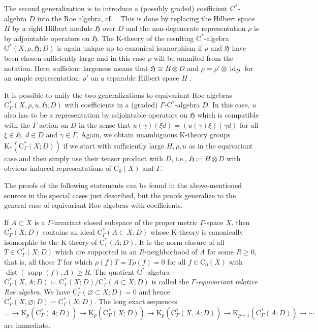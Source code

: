 \documentclass[11pt]{article}
\numberwithin{equation}{section}
\numberwithin{equation}{section}
\theoremstyle{definition}
\newcommand{\Ct}{\mathrm{C}}
\newcommand{\Cz}{\Ct_0}
\newcommand{\HilbertMod}{\mathfrak{H}}
\DeclareMathOperator{\id}{id}
\DeclareMathOperator{\dist}{dist}
\DeclareMathOperator{\supp}{supp}
\newcommand{\K}{\mathrm{K}}
\newcommand{\textCstar}{\ensuremath{\mathrm{C}^*\!}}
\newcommand{\Roe}{\mathrm{C}^*}
\begin{document}
The second generalization is to introduce a (possibly graded) coefficient \textCstar-algebra $D$ into the Roe algebra, cf.\ \cite{HankePapeSchick,HigsonPedersenRoe,WulffTwisted}. This is done by replacing the Hilbert space $H$ by a right Hilbert module $\HilbertMod$ over $D$ and the non-degenerate representation $\rho$ is by adjointable operators on $\HilbertMod$.
The $\K$-theory of the resulting \textCstar-algebra $\Roe(X,\rho,\HilbertMod;D)$ is again unique up to canonical isomorphism if $\rho$ and $\HilbertMod$ have been chosen sufficiently large and in this case $\rho$ will be ommited from the notation. Here, sufficient largeness means that $\HilbertMod\cong H\otimes D$ and $\rho=\rho'\otimes \id_D$ for an ample representation~$\rho'$ on a separable Hilbert space $H$ \cite[Definition 4.5]{HigsonPedersenRoe}.


It is possible to unify the two generalizations to equivariant Roe algebras $\Roe_\Gamma(X,\rho,u,\HilbertMod;D)$ with coefficients in a (graded) $\Gamma$-\textCstar-algebra $D$.
In this case, $u$ also has to be a representation by adjointable operators on $\HilbertMod$ which is compatible with the $\Gamma$-action on $D$ in the sense that $u(\gamma)(\xi d)=(u(\gamma)\xi) (\gamma d)$ for all $\xi\in\HilbertMod$, $d\in D$ and $\gamma\in\Gamma$.
Again, we obtain unambiguous $\K$-theory groups $\K_*(\Roe_\Gamma(X;D))$ if we start with sufficiently large $H,\rho,u$ as in the equivariant case and then simply use their tensor product with $D$, i.e., $\HilbertMod\coloneqq H\otimes D$ with obvious induced representations of $\Cz(X)$ and $\Gamma$.




The proofs of the following statements can be found in the above-mentioned sources in the special cases just described, but the proofs generalize to the general case of equivariant Roe-algebras with coefficients.

If $A\subset X$ is a $\Gamma$-invariant closed subspace of the proper metric $\Gamma$-space $X$, then $\Roe_\Gamma(X;D)$ contains an ideal $\Roe_\Gamma(A\subset X;D)$ whose $\K$-theory is canonically isomorphic to the $\K$-theory of $\Roe_\Gamma(A;D)$.
It is the norm closure of all $T\in\Roe_\Gamma(X;D)$ which are supported in an $R$-neighborhood of $A$ for some $R\geq 0$, that is, all those $T$ for which $\rho(f)T=T\rho(f)=0$ for all $f\in\Cz(X)$ with $\dist(\supp(f),A)\geq R$.
The quotient \textCstar-algebra $\Roe_\Gamma(X,A;D)\coloneqq \Roe_\Gamma(X;D)/\Roe_\Gamma(A\subset X;D)$ is called the \emph{$\Gamma$-equivariant relative Roe algebra}. We have $\Roe_\Gamma(\varnothing\subset X;D)=0$ and hence $\Roe_\Gamma(X,\varnothing;D)=\Roe_\Gamma(X;D)$. The long exact sequences
\[
\dots\to\K_p(\Roe_\Gamma(A;D))\to \K_p(\Roe_\Gamma(X;D))\to \K_p(\Roe_\Gamma(X,A;D))\to \K_{p-1}(\Roe_\Gamma(A;D))\to \cdots
\]
are immediate.
\end{document}
